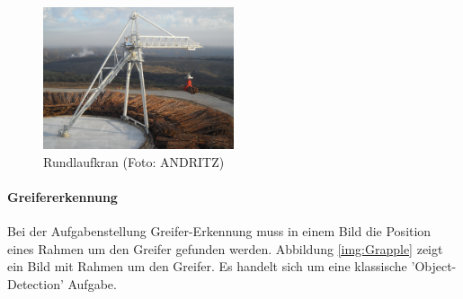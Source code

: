 	\begin{figure}[h]
		\centering
		\includegraphics[width=0.5\textwidth, center]{bilder/Grundlagen/Kran_vollstaendig_N1_030.jpg}
		\caption[Rund-Kran]{Rundlaufkran (Foto: ANDRITZ)}
		\label{img:CircularCrane}
	\end{figure}		

	\paragraph{Greifererkennung} Bei der Aufgabenstellung Greifer-Erkennung muss in einem Bild die Position eines Rahmen um den Greifer gefunden werden. Abbildung \ref{img:Grapple} zeigt ein Bild mit Rahmen um den Greifer. Es handelt sich um eine klassische 'Object-Detection' Aufgabe.

